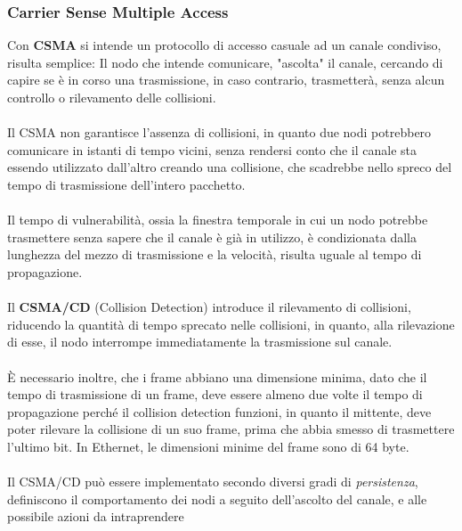 \documentclass[12pt, letterpaper]{article}
\newcommand{\acc}{\\\hphantom{}\\}
\begin{document}
\subsubsection{Carrier Sense Multiple Access}
Con \textbf{CSMA} si intende un protocollo di accesso casuale ad un canale condiviso, risulta semplice: Il nodo che intende 
comunicare, "ascolta" il canale, cercando di capire se è in corso una trasmissione, in caso contrario, trasmetterà, senza 
alcun controllo o rilevamento delle collisioni.\acc 
Il CSMA non garantisce l'assenza di collisioni, in quanto due nodi potrebbero comunicare in istanti di tempo 
vicini, senza rendersi conto che il canale sta essendo utilizzato dall'altro creando una collisione, che scadrebbe nello 
spreco del tempo di trasmissione dell'intero pacchetto.\acc 
Il tempo di vulnerabilità, ossia la finestra temporale in cui un nodo potrebbe trasmettere senza sapere che il canale 
è già in utilizzo, è condizionata dalla lunghezza del mezzo di trasmissione e la velocità, risulta uguale 
al tempo di propagazione.\acc 
Il \textbf{CSMA/CD} (Collision Detection) introduce il rilevamento di collisioni, riducendo la quantità di tempo sprecato 
nelle collisioni, in quanto, alla rilevazione di esse, il nodo interrompe immediatamente la trasmissione sul canale.\acc 
È necessario inoltre, che i frame abbiano una dimensione minima, dato che il tempo di trasmissione di un frame, deve 
essere almeno due volte il tempo di propagazione perché il collision detection funzioni, in quanto il mittente, deve poter 
rilevare la collisione di un suo frame, prima che abbia smesso di trasmettere l'ultimo bit. In Ethernet, le dimensioni 
minime del frame sono di 64 byte.\acc Il CSMA/CD può essere implementato secondo diversi gradi di \textit{persistenza},
definiscono il comportamento dei nodi a seguito dell'ascolto del canale, e alle possibile azioni da intraprendere 
\end{document}
